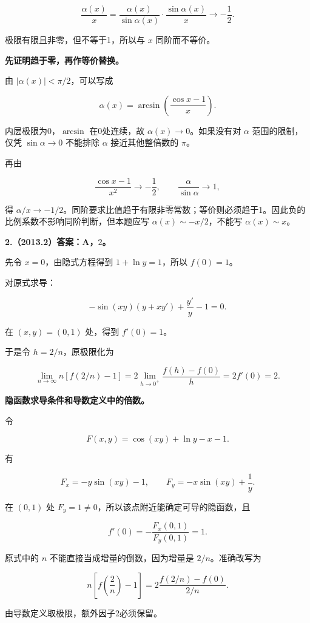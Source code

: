 \documentclass[UTF8,11pt,fontset=windows]{ctexart}
\begin{document}
$$
\frac{\alpha(x)}x
=\frac{\alpha(x)}{\sin\alpha(x)}\cdot\frac{\sin\alpha(x)}x
\longrightarrow-\frac12.
$$

极限有限且非零，但不等于1，所以与 $x$ 同阶而不等价。

\textbf{先证明趋于零，再作等价替换。}

由 $|\alpha(x)|<\pi/2$，可以写成

$$
\alpha(x)=\arcsin\left(\frac{\cos x-1}{x}\right).
$$

内层极限为0，$\arcsin$ 在0处连续，故 $\alpha(x)\to0$。如果没有对 $\alpha$ 范围的限制，仅凭 $\sin\alpha\to0$ 不能排除 $\alpha$ 接近其他整倍数的 $\pi$。

再由

$$
\frac{\cos x-1}{x^2}\to-\frac12,
\qquad \frac{\alpha}{\sin\alpha}\to1,
$$

得 $\alpha/x\to-1/2$。同阶要求比值趋于有限非零常数；等价则必须趋于1。因此负的比例系数不影响同阶判断，但本题应写 $\alpha(x)\sim-x/2$，不能写 $\alpha(x)\sim x$。

\clearpage

\textbf{2.（2013.2）答案：A，$2$。}

先令 $x=0$，由隐式方程得到 $1+\ln y=1$，所以 $f(0)=1$。

对原式求导：

$$
-\sin(xy)(y+xy')+\frac{y'}y-1=0.
$$

在 $(x,y)=(0,1)$ 处，得到 $f'(0)=1$。

于是令 $h=2/n$，原极限化为

$$
\lim_{n\to\infty}n[f(2/n)-1]
=2\lim_{h\to0^+}\frac{f(h)-f(0)}h
=2f'(0)=2.
$$

\textbf{隐函数求导条件和导数定义中的倍数。}

令

$$
F(x,y)=\cos(xy)+\ln y-x-1.
$$

有

$$
F_x=-y\sin(xy)-1,\qquad
F_y=-x\sin(xy)+\frac1y.
$$

在 $(0,1)$ 处 $F_y=1\ne0$，所以该点附近能确定可导的隐函数，且

$$
f'(0)=-\frac{F_x(0,1)}{F_y(0,1)}=1.
$$

原式中的 $n$ 不能直接当成增量的倒数，因为增量是 $2/n$。准确改写为

$$
n\left[f\left(\frac2n\right)-1\right]
=2\frac{f(2/n)-f(0)}{2/n}.
$$

由导数定义取极限，额外因子2必须保留。

\clearpage
\end{document}
